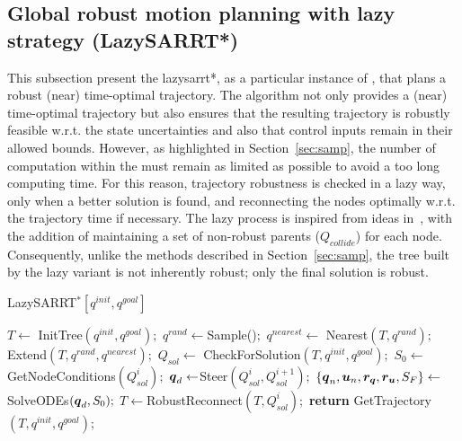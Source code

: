 \subsection{Global robust motion planning with lazy strategy (LazySARRT*)}\label{sec:lazy_rrt*}

This subsection present the \gls{lazysarrt*}, as a particular instance of , that plans a robust (near) time-optimal trajectory.
The algorithm not only provides a (near) time-optimal trajectory but also ensures that the resulting trajectory is robustly feasible w.r.t. the state uncertainties and also that control inputs remain in their allowed bounds.
However, as highlighted in Section~\ref{sec:samp}, the number of  computation within the  must remain as limited as possible to avoid a too long computing time. 
For this reason, trajectory robustness is checked in a lazy way, only when a better solution is found, and reconnecting the nodes optimally w.r.t. the trajectory time if necessary.
The lazy process is inspired from ideas in~\cite{cLazy1,cLazy2}, with the addition of maintaining a set of non-robust parents ($Q_{collide}$) for each node.
Consequently, unlike the  methods described in Section~\ref{sec:samp}, the tree built by the lazy variant is not inherently robust; only the final solution is robust.

\begin{algorithm}[h!]
    \caption{LazySARRT$^* [q^{init}, q^{goal}]$}\label{alg:LazySARRT*}
    \begin{algorithmic}[1]
        \State $T \gets$ InitTree$({q^{init}, q^{goal}});$
            \State $q^{rand} \gets $Sample()$;$
            \State $q^{nearest} \gets$ Nearest$(T,{q^{rand}});$
            \State Extend$(T, q^{rand}, q^{nearest});$
            \State $Q_{sol} \gets$ CheckForSolution$(T, q^{init}, q^{goal});$
                    \State $S_0 \gets $GetNodeConditions$(Q_{sol}^{i});$
                    \State $\boldsymbol{q}_d \gets $Steer$(Q_{sol}^{i}, Q_{sol}^{i+1});$
                    \State $\left \{\boldsymbol{q}_n, \boldsymbol{u}_n, \boldsymbol{r_q}, \boldsymbol{r_u}, S_F \right \}  \gets $SolveODEs$(\boldsymbol{q}_d, S_0);$
                        \State $T \gets $RobustReconnect$(T, Q_{sol}^{i});$
                    \EndIf
                \EndFor
            \EndIf
        \EndWhile
        \State \textbf{return} GetTrajectory$(T, q^{init}, q^{goal})$;
    \end{algorithmic}
\end{algorithm}

